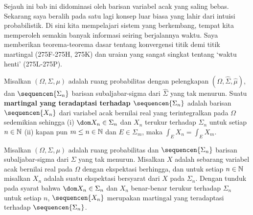 
\def\chaptername{Teori probabilitas}
\def\sectionname{Martingal}


Sejauh ini bab ini didominasi oleh barisan variabel acak yang saling bebas.
Sekarang saya beralih pada satu lagi konsep luar biasa yang lahir dari intuisi
probabilistik. Di sini kita mempelajari sistem yang berkembang, tempat kita
memperoleh semakin banyak informasi seiring berjalannya waktu. Saya memberikan
teorema-teorema dasar tentang konvergensi titik demi titik martingal
(275F-275H, %
275K) dan uraian yang sangat singkat tentang `waktu henti'
(275L-275P). %

 Misalkan $(\Omega,\Sigma,\mu)$ adalah ruang
probabilitas dengan pelengkapan $(\Omega,\hat\Sigma,\hat\mu)$, dan
$\sequencen{\Sigma_n}$ barisan subaljabar-sigma dari $\hat\Sigma$ yang tak
menurun. 
Suatu {\bf martingal yang teradaptasi terhadap
$\sequencen{\Sigma_n}$} adalah barisan $\sequencen{X_n}$ dari variabel acak
bernilai real yang terintegralkan pada $\Omega$ sedemikian sehingga
(i) $\dom X_n\in\Sigma_n$ dan $X_n$ terukur terhadap $\Sigma_n$ untuk setiap
$n\in\Bbb N$ (ii) kapan pun $m\le n\in\Bbb N$ dan $E\in\Sigma_m$, maka
$\int_EX_{n}=\int_EX_m$.


 Misalkan $(\Omega,\Sigma,\mu)$ adalah ruang probabilitas dan
$\sequencen{\Sigma_n}$ barisan subaljabar-sigma dari $\Sigma$ yang tak
menurun. Misalkan $X$ adalah sebarang variabel acak bernilai real pada
$\Omega$ dengan ekspektasi berhingga, dan untuk setiap $n\in\Bbb N$ misalkan
$X_n$ adalah suatu ekspektasi bersyarat dari $X$ pada $\Sigma_n$. Dengan tunduk pada syarat bahwa
$\dom X_n\in\Sigma_n$ dan $X_n$ benar-benar terukur terhadap $\Sigma_n$
untuk setiap $n$,
$\sequencen{X_n}$ merupakan martingal yang teradaptasi terhadap
$\sequencen{\Sigma_n}$.

